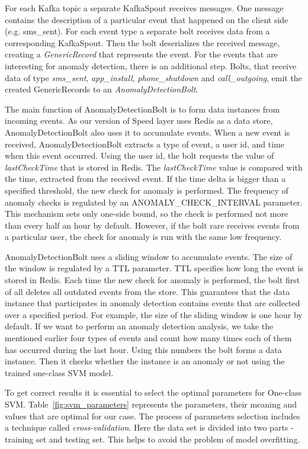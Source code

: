 For each Kafka topic a separate KafkaSpout receives messages.
One message contains the description of a particular event that happened on the client side (e.g. sms\_sent).
For each event type a separate bolt receives data from a corresponding KafkaSpout.
Then the bolt deserializes the received message, creating a \textit{GenericRecord} that represents the event.
For the events that are interesting for anomaly detection, there is an additional step.
Bolts, that receive data of type \textit{sms\_sent}, \textit{app\_install}, \textit{phone\_shutdown} and \textit{call\_outgoing}, emit the created GenericRecords to an \textit{AnomalyDetectionBolt}.

The main function of AnomalyDetectionBolt is to form data instances from incoming events.
As our version of Speed layer uses Redis as a data store, AnomalyDetectionBolt also uses it to accumulate events.
When a new event is received, AnomalyDetectionBolt extracts a type of event, a user id, and time when this event occurred.
Using the user id, the bolt requests the value of \textit{lastCheckTime} that is stored in Redis.
The \textit{lastCheckTime} value is compared with the time, extracted from the received event.
If the time delta is bigger than a specified threshold, the new check for anomaly is performed.
The frequency of anomaly checks is regulated by an ANOMALY\_CHECK\_INTERVAL parameter.
This mechanism sets only one-side bound, so the check is performed not more than every half an hour by default.
However, if the bolt rare receives events from a particular user, the check for anomaly is run with the same low frequency. 

AnomalyDetectionBolt uses a sliding window to accumulate events.
The size of the window is regulated by a TTL parameter.
TTL specifies how long the event is stored in Redis.
Each time the new check for anomaly is performed, the bolt first of all deletes all outdated events from the store.
This guarantees that the data instance that participates in anomaly detection contains events that are collected over a specified period.
For example, the size of the sliding window is one hour by default.
If we want to perform an anomaly detection analysis, we take the mentioned earlier four types of events and count how many times each of them has occurred during the last hour.
Using this numbers the bolt forms a data instance.  
Then it checks whether the instance is an anomaly or not using the trained one-class SVM model.

To get correct results it is essential to select the optimal parameters for One-class SVM.
Table~\ref{fig:svm_parameters} represents the parameters, their meaning and values that are optimal for our case.
The process of parameters selection includes a technique called \textit{cross-validation}.
Here the data set is divided into two parts - training set and testing set.
This helps to avoid the problem of model overfitting.  

